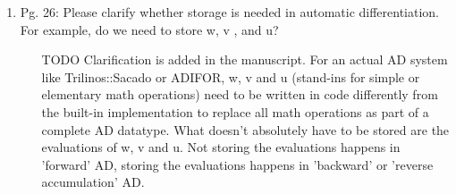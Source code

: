 \documentclass{article}
\begin{document}
\begin{enumerate}
  \item
Pg. 26: Please clarify whether storage is needed in automatic differentiation. For
example, do we need to store w, v , and u?

{\color{red}  
\begin{itemize}
     \item
         [TODO]
      Clarification is added in the manuscript. For an actual AD system like Trilinos::Sacado or ADIFOR, w, v and u (stand-ins for simple or elementary math operations) need to be written in code differently from the built-in implementation to replace all math operations as part of a complete AD datatype. What doesn't absolutely have to be stored are the evaluations of w, v and u. Not storing the evaluations happens in 'forward' AD, storing the evaluations happens in 'backward' or 'reverse accumulation' AD.  
  \end{itemize}}


  \end{enumerate}
\end{document}
